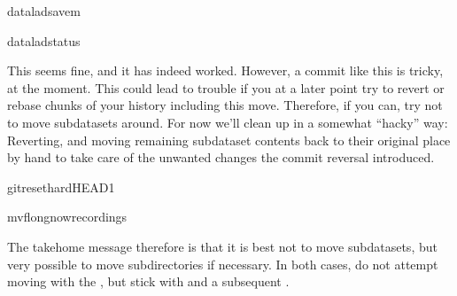 \begin{sphinxVerbatim}[commandchars=\\\{\}]
dataladsave\PYGZhy{}m
\end{sphinxVerbatim}

\begin{sphinxVerbatim}[commandchars=\\\{\}]
dataladstatus
\end{sphinxVerbatim}

\sphinxAtStartPar
This seems fine, and it has indeed worked.
However,  a commit like this is tricky, at the moment. This could
lead to trouble if you at a later point try to revert or rebase chunks of your
history including this move. Therefore, if you can, try not to move subdatasets
around. For now we’ll clean up in a somewhat “hacky” way: Reverting, and
moving remaining subdataset contents back to their original place by hand
to take care of the unwanted changes the commit reversal introduced.

\begin{sphinxVerbatim}[commandchars=\\\{\}]
gitreset\PYGZhy{}\PYGZhy{}hardHEAD\PYGZti{}1
\end{sphinxVerbatim}

\begin{sphinxVerbatim}[commandchars=\\\{\}]
mv\PYGZhy{}flongnowrecordings
\end{sphinxVerbatim}

\sphinxAtStartPar
The take\sphinxhyphen{}home message therefore is that it is best not to move subdatasets,
but very possible to move subdirectories if necessary. In both cases, do not
attempt moving with the , but stick with  and
a subsequent .


